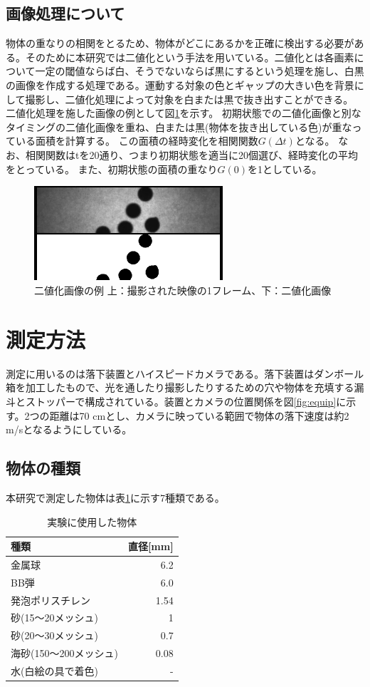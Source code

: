 \documentclass[a4paper,10pt,twocolumn,dvipdfmx]{jsarticle}
\begin{document}
\subsection{画像処理について}
物体の重なりの相関をとるため、物体がどこにあるかを正確に検出する必要がある。そのために本研究では二値化という手法を用いている。二値化とは各画素について一定の閾値ならば白、そうでないならば黒にするという処理を施し、白黒の画像を作成する処理である。運動する対象の色とギャップの大きい色を背景にして撮影し、二値化処理によって対象を白または黒で抜き出すことができる。 \\
二値化処理を施した画像の例として図\ref{fig:threshold}を示す。
初期状態での二値化画像と別なタイミングの二値化画像を重ね、白または黒(物体を抜き出している色)が重なっている面積を計算する。
この面積の経時変化を相関関数$G(\Delta t)$となる。
なお、相関関数はtを20通り、つまり初期状態を適当に20個選び、経時変化の平均をとっている。
また、初期状態の面積の重なり$G(0)$を1としている。
\begin{figure}[H]
	\includegraphics[clip,width=7.0cm]{bb.png}
	\caption{二値化画像の例 上：撮影された映像の1フレーム、下：二値化画像}
	\label{fig:threshold}
\end{figure}

\section{測定方法}
測定に用いるのは落下装置とハイスピードカメラである。落下装置はダンボール箱を加工したもので、光を通したり撮影したりするための穴や物体を充填する漏斗とストッパーで構成されている。装置とカメラの位置関係を図\ref{fig:equip}に示す。2つの距離は70 cmとし、カメラに映っている範囲で物体の落下速度は約2 m/sとなるようにしている。
\subsection{物体の種類}
本研究で測定した物体は表\ref{tb:ballkind}に示す7種類である。 \\
\begin{table}[H]
	\caption{実験に使用した物体 \label{tb:ballkind}}
	\begin{tabular}{lr}
		\toprule
		種類 & 直径[mm] \\
		\midrule
		金属球 & 6.2 \\
		BB弾 & 6.0 \\
		発泡ポリスチレン & 1.54 \\
		砂(15〜20メッシュ) & 1 \\
		砂(20〜30メッシュ) & 0.7 \\
		海砂(150〜200メッシュ) & 0.08 \\
		水(白絵の具で着色) & - \\
		\bottomrule
	\end{tabular}
\end{table}
\end{document}

